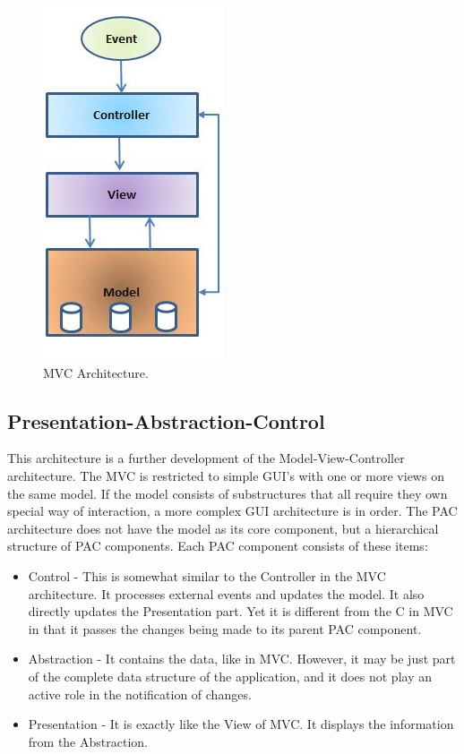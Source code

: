 \documentclass{article}
\begin{document}
\begin{figure}[h]
\centering
\includegraphics[scale=0.8]{mvc.png}
\caption{MVC Architecture.}
\label{fig_mvc}
\end{figure}



\subsection{Presentation-Abstraction-Control}

This architecture is a further development of the Model-View-Controller architecture. The MVC is restricted to simple GUI's with one or more views on the same model. If the model consists of substructures that all require they own special way of interaction, a more complex GUI architecture is in order. The PAC architecture does not have the model as its core component, but a hierarchical structure of PAC components. Each PAC component consists of these items:

\begin{itemize}

\item Control - This is somewhat similar to the Controller in the MVC architecture. It processes external events and updates the model. It also directly updates the Presentation part. Yet it is different from the C in MVC in that it passes the changes being made to its parent PAC component.
\item Abstraction - It contains the data, like in MVC. However, it may be just part of the complete data structure of the application, and it does not play an active role in the notification of changes.
\item Presentation - It is exactly like the View of MVC. It displays the information from the Abstraction.

\end{itemize}
\end{document}

